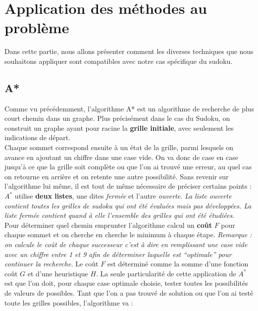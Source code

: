 \chapter{Application des méthodes au problème}
    Dans cette partie, nous allons présenter comment les diverses techniques que nous souhaitons appliquer sont compatibles avec notre cas spécifique du sudoku.
    \section{A*}
    Comme vu précédemment, l'algorithme A* est un algorithme de recherche de plus court chemin dans un graphe. Plus précisément dans le cas du Sudoku, on construit un graphe ayant pour racine la \textbf{grille initiale}, avec seulement les indications de départ.\\
            Chaque sommet correspond ensuite à un état de la grille, parmi lesquels on avance en ajoutant un chiffre dans une case vide. On va donc de case en case jusqu'à ce que la grille soit complète ou que l'on ai trouvé une erreur, au quel cas on retourne en arrière et on retente une autre possibilité.
            \bigskip
            Sans revenir sur l'algorithme lui même, il est tout de même nécessaire de préciser certains points : $A^*$ utilise \textbf{deux listes}, une dites \textit{fermée} et l'autre \textit{ouverte}. \textit{La liste ouverte contient toutes les grilles de sudoku qui ont été évaluées mais pas développées. La liste fermée contient quand à elle l'ensemble des grilles qui ont été étudiées.}\\
            Pour déterminer quel chemin emprunter l'algorithme calcul un \textbf{coût} $F$ pour chaque sommet et on cherche en cherche le minimum à chaque étape. \textit{Remarque : on calcule le coût de chaque successeur c'est à dire en remplissant une case vide avec un chiffre entre 1 et 9 afin de déterminer laquelle est ``optimale'' pour continuer la recherche.} Le coût $F$ est déterminé comme la somme d'une fonction coût $G$ et d'une heuristique $H$.
            \bigskip
            La seule particularité de cette application de $A^*$ est que l'on doit, pour chaque case optimale choisie, tester toutes les possibilités de valeurs de possibles. Tant que l'on a pas trouvé de solution ou que l'on ai testé toute les grilles possibles, l'algorithme va :
